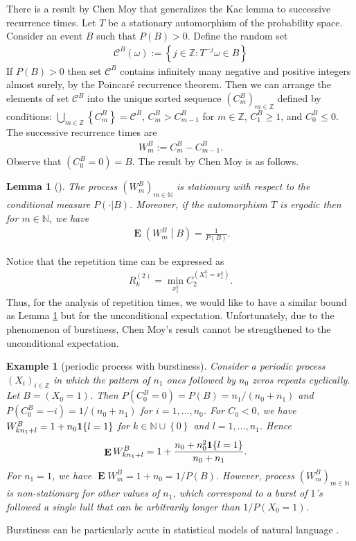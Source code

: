 \documentclass[a4paper,12pt]{article}
\newcommand{\okra}[1]{\left( #1 \right)}
\newcommand{\klam}[1]{\left\{ #1 \right\}}
\DeclareMathOperator{\mean}{\mathbf{E}}
\newcommand{\boole}[1]{{\bf 1}{\klam{#1}}}
\newtheorem{example}{Example}
\newtheorem{lemma}{Lemma}
\begin{document}
There is a result by Chen Moy that generalizes the Kac lemma to
successive recurrence times.  Let $T$ be a stationary automorphism of
the probability space.  Consider an event $B$ such that
$P(B)>0$. Define the random set
\begin{align}
  \mathcal{C}^B(\omega):=\klam{j\in\mathbb{Z}: T^{-j}\omega\in B}
\end{align}
If $P(B)>0$ then set $\mathcal{C}^B$ contains infinitely many negative
and positive integers almost surely, by the Poincar\'e recurrence
theorem. Then we can arrange the elements of set $\mathcal{C}^B$ into
the unique sorted sequence $(C^B_m)_{m\in\mathbb{Z}}$ defined by
conditions: $\bigcup_{m\in\mathbb{Z}}\klam{C^B_m}=\mathcal{C}^B$,
$C^B_m>C^B_{m-1}$ for $m\in\mathbb{Z}$, $C^B_1\ge 1$, and
$C^B_0\le 0$.  The successive recurrence times are 
\begin{align}
  \label{Successive}
  W^B_m:=C^B_m-C^B_{m-1}.
\end{align}
Observe that $(C^B_0=0)=B$. The result by Chen Moy is as follows.
\begin{lemma}[\cite{ChenMoy59}]
  \label{theoChenMoy}
  The process $(W^B_m)_{m\in\mathbb{N}}$ is stationary with respect to
  the conditional measure $P(\cdot|B)$. Moreover, if the automorphism
  $T$ is ergodic then for $m\in\mathbb{N}$, we have
  \begin{align}
    \mean\okra{W^B_m\middle|B}
    =
    \frac{1}{P(B)}.
  \end{align}
\end{lemma}

Notice that the repetition time can be expressed as
\begin{align}
  R^{(2)}_k=\min_{x_1^k} C^{(X_1^k=x_1^k)}_2.
\end{align}
Thus, for the analysis of repetition times, we would like to have a
similar bound as Lemma \ref{theoChenMoy} but for the unconditional
expectation. Unfortunately, due to the phenomenon of burstiness, Chen
Moy's result cannot be strengthened to the unconditional expectation.
\begin{example}[periodic process with burstiness]
  Consider a periodic process $(X_i)_{i\in\mathbb{Z}}$ in which the
  pattern of $n_1$ ones followed by $n_0$ zeros repeats
  cyclically. Let $B=(X_0=1)$. Then $P(C^B_0=0)=P(B)=n_1/(n_0+n_1)$
  and $P(C^B_0=-i)=1/(n_0+n_1)$ for $i=1,\ldots,n_0$. For $C_0<0$, we
  have $W^B_{kn_1+l}=1+n_0\boole{l=1}$ for
  $k\in\mathbb{N}\cup\klam{0}$ and $l=1,\ldots,n_1$. Hence
\begin{align}
  \mean W^B_{kn_1+l}&=1+\frac{n_0+n_0^2\boole{l=1}}{n_0+n_1}.
\end{align}
For $n_1=1$, we have $\mean W^B_m=1+n_0=1/P(B)$. However, process
$(W^B_m)_{m\in\mathbb{N}}$ is non-stationary for other values of
$n_1$, which correspond to a burst of $1$'s followed a single lull
that can be arbitrarily longer than $1/P(X_0=1)$.
\end{example}
\noindent
Burstiness can be particularly acute in statistical models of natural
language \cite{Katz96,AltmannPierrehumbertMotter09,Debowski15f}.
\end{document}
